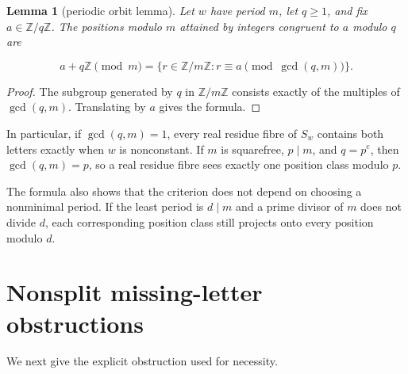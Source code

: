\documentclass[11pt]{article}
\newtheorem{lemma}[theorem]{Lemma}
\theoremstyle{remark}
\numberwithin{equation}{section}
\begin{document}
\begin{lemma}[periodic orbit lemma]

Let $w$ have period $m$, let $q\ge1$, and fix $a\in\mathbb Z/q\mathbb Z$.
The positions modulo $m$ attained by integers congruent to $a$ modulo $q$ are

\[
a+q\mathbb Z\pmod m
=\{r\in\mathbb Z/m\mathbb Z:r\equiv a
\pmod{\gcd(q,m)}\}.
\]

\end{lemma}
\begin{proof}

The subgroup generated by $q$ in $\mathbb Z/m\mathbb Z$ consists exactly of
the multiples of $\gcd(q,m)$. Translating by $a$ gives the formula.
\end{proof}

In particular, if $\gcd(q,m)=1$, every real residue fibre of $S_w$ contains
both letters exactly when $w$ is nonconstant. If $m$ is squarefree,
$p\mid m$, and $q=p^e$, then $\gcd(q,m)=p$, so a real residue fibre sees
exactly one position class modulo $p$.

The formula also shows that the criterion does not depend on choosing a
nonminimal period. If the least period is $d\mid m$ and a prime divisor of
$m$ does not divide $d$, each corresponding position class still projects
onto every position modulo $d$.

\section{Nonsplit missing-letter obstructions}

We next give the explicit obstruction used for necessity.
\end{document}
